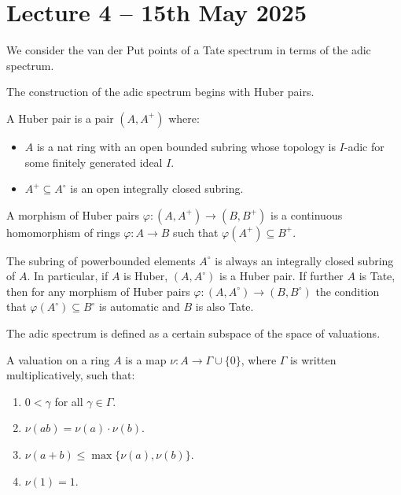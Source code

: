 \section{Lecture 4 -- 15th May 2025}\label{sec: lecture 4}
We consider the van der Put points of a Tate spectrum in terms of the adic spectrum. 

The construction of the adic spectrum begins with Huber pairs. 
\begin{definition}\label{def: Huber pair}
    A Huber pair is a pair $(A,A^{+})$ where:
    \begin{itemize}
        \item $A$ is a nat ring with an open bounded subring whose topology is $I$-adic for some finitely generated ideal $I$. 
        \item $A^{+}\subseteq A^{\circ}$ is an open integrally closed subring. 
    \end{itemize}
\end{definition}
\begin{definition}\label{def: morphism of Huber pairs}
    A morphism of Huber pairs $\varphi:(A,A^{+})\to(B,B^{+})$ is a continuous homomorphism of rings $\varphi:A\to B$ such that $\varphi(A^{+})\subseteq B^{+}$. 
\end{definition}
\begin{remark}
    The subring of powerbounded elements $A^{\circ}$ is always an integrally closed subring of $A$. In particular, if $A$ is Huber, $(A,A^{\circ})$ is a Huber pair. If further $A$ is Tate, then for any morphism of Huber pairs $\varphi:(A,A^{\circ})\to (B,B^{\circ})$ the condition that $\varphi(A^{\circ})\subseteq B^{\circ}$ is automatic and $B$ is also Tate. 
\end{remark}
The adic spectrum is defined as a certain subspace of the space of valuations. 
\begin{definition}[Valuation]\label{def: valuation}
    A valuation on a ring $A$ is a map $\nu:A\to\Gamma\cup\{0\}$, where $\Gamma$ is written multiplicatively, such that:
    \begin{enumerate}[label=(\roman*)]
        \item $0<\gamma$ for all $\gamma\in\Gamma$. 
        \item $\nu(ab)=\nu(a)\cdot\nu(b)$. 
        \item $\nu(a+b)\leq\max\{\nu(a),\nu(b)\}$. 
        \item $\nu(1)=1$. 
    \end{enumerate}
\end{definition}
